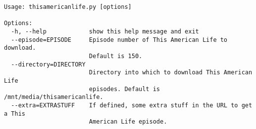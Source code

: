 \begin{verbatim}
Usage: thisamericanlife.py [options]

Options:
  -h, --help            show this help message and exit
  --episode=EPISODE     Episode number of This American Life to download.
                        Default is 150.
  --directory=DIRECTORY
                        Directory into which to download This American Life
                        episodes. Default is /mnt/media/thisamericanlife.
  --extra=EXTRASTUFF    If defined, some extra stuff in the URL to get a This
                        American Life episode.
\end{verbatim}